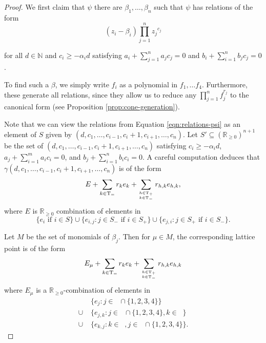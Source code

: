 \documentclass{amsart}
\theoremstyle{plain}
\theoremstyle{definition}
\theoremstyle{remark}
\numberwithin{equation}{section}
\newcommand\bida{a}
\newcommand\bidb{b}
\DeclareMathOperator{\Te}{T_=}
\DeclareMathOperator{\Tp}{T_+}
\DeclareMathOperator{\Tm}{T_-}
\begin{document}
\begin{proof}
We first claim that $\psi$ there are $\beta_1, \ldots, \beta_n$ such that $\psi$ has relations of the form
\begin{equation}\label{eqn:relations-psi}
	(z_i - \beta_i)\prod_{j=1}^n {z_j}^{c_{j}}
\end{equation}

\noindent
for all $d \in \mathbb{N}$ and $c_i \ge -\alpha_i d$ satisfying $\bida_i + \sum_{j = 1}
^n \bida_j c_j = 0$ and $\bidb_i + \sum_{i=1}^n \bidb_j c_j = 0$.

To find such a $\beta$, we simply write $f_i$ as a 
polynomial in $f_1, \ldots f_4$. Furthermore, these
generate all relations, since they allow us to reduce any $\prod_{j =
1}^n f_j^{r_j}$ to the canonical form (see Proposition \ref{prop:cone-generation}).  

Note that we can view the relations from Equation
\ref{eqn:relations-psi} as an element of $S$ given
by $(d, c_1, \ldots, c_{i-1}, c_i + 1, c_{i+1}, \ldots , c_n)$.  Let $S'\subseteq (\mathbb{R}_{\ge 0})^{n+1}$ be the
set of $(d, c_1, \ldots, c_{i-1}, c_i + 1, c_{i+1}, \ldots , c_n)$ satisfying $c_i \ge -\alpha_i d$,
$\bida_j + \sum_{i = 1}^m \bida_i c_i = 0$, and $\bidb_j + \sum_{i=1}^n \bidb_i c_i
= 0$.  A careful computation deduces that $\gamma (d, c_1, \ldots, c_{i-1}, c_i + 1, c_{i+1}, \ldots, c_n)$ is of the form 
\[
	E + \sum_{k\in \Te} r_k e_k + \sum_{h\in \Tp \atop k\in \Tm} r_{h,k} e_{h,k},
\] 
where $E$ is $\mathbb{R}_{\ge 0}$
combination of elements in 
\[
	\{e_i \mbox{ if } i\in S\} \cup \{e_{i,j}: j\in S_- \mbox{ if } i \in S_+\} \cup \{e_{j,i}: j\in S_+ \mbox{ if } i \in S_-\}.
\]


Let $M$ be the set of monomials of $\beta_j$.  Then for $\mu\in M$, the corresponding lattice point is of the form
\[
	E_\mu + \sum_{k\in \Te} r_k e_k + \sum_{h\in \Tp \atop k\in \Tm} r_{h,k} e_{h,k}
\]
where $E_\mu$ is a $\mathbb{R}_{\ge 0}$-combination of elements in
\begin{align*}
			& \{e_j : j\in \Te \cap \{1, 2, 3, 4\}\} \\
	\cup \; 	& \{e_{j, k}: j\in \Te \cap \{1, 2, 3, 4\}, k\in \Tm\}\\
	\cup \; 	& \{e_{k,j}: k\in \Tp, j\in \Tm \cap \{1, 2, 3, 4\}\}.
\end{align*}


\end{proof}
\end{document}
